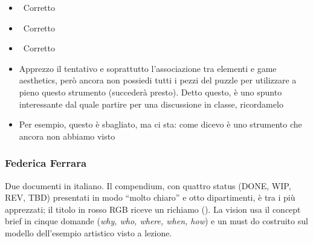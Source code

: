 {\begin{itemize}
  \item {} \rvBene\ Corretto
  \item {} \rvBene\ Corretto
  \item {} \rvBene\ Corretto
  \item {} Apprezzo il tentativo e soprattutto l'associazione tra elementi e game aesthetics, però ancora non possiedi tutti i pezzi del puzzle per utilizzare a pieno questo strumento (succederà presto). Detto questo, è uno spunto interessante dal quale partire per una discussione in classe, ricordamelo
  \item {} Per esempio, questo è sbagliato, ma ci sta: come dicevo è uno strumento che ancora non abbiamo visto
\end{itemize}
}

\subsubsection{Federica Ferrara}
Due documenti in italiano. Il compendium, con quattro status (DONE, WIP, REV, TBD) presentati in modo ``molto chiaro'' e otto dipartimenti, è tra i più apprezzati; il titolo in rosso RGB riceve un richiamo (\rvAvviso). La vision usa il concept brief in cinque domande (\emph{why, who, where, when, how}) e un must do costruito sul modello dell'esempio artistico visto a lezione.
